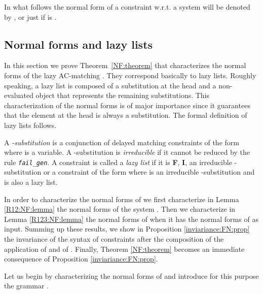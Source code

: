 \documentclass[submission,copyright,creativecommons]{eptcs}
\newcommand \lazy{}
\numberwithin{subcase}{case}
\begin{document}
In what follows the normal form of a constraint  w.r.t. 
a system   will be denoted by , or just
 if  is \lazy.

\subsection{Normal forms and lazy lists}
\label{NF:subsec}
In this section we prove Theorem~\ref{NF:theorem} that characterizes  the normal forms
of the lazy AC-matching \lazy. They correspond basically to lazy lists. 
Roughly speaking, a lazy list is composed of a  substitution at the head
 and  a non-evaluated  object that represents the remaining substitutions.  
This characterization of the normal forms is of major importance since 
it guarantees   that  the  element at the head  is always a substitution. 
The formal definition of lazy lists follows.

\begin{definition}
\label{wfll:def}
A \emph{-substitution} is a conjunction of delayed matching constraints of
the form  where  is a variable. A -substitution is
\emph{irreducible} if it cannot be reduced by the rule \texttt{\emph{fail\_gen}}. A
constraint is called a \emph{lazy list} if it is \textbf{F}, \textbf{I}, an
irreducible -substitution or a constraint of the form 
where  is an irreducible -substitution and  
 is also a lazy list.
\end{definition}

In order to characterize the normal forms of \lazy we first characterize in Lemma
\ref{R12:NF:lemma} the normal forms  of the system . Then we characterize in Lemma
 \ref{R123:NF:lemma} the normal forms of 
when it has  the normal forms of  as input. Summing up these results,
we show in
 Proposition \ref{inviariance:FN:prop}
the invariance of the syntax of constraints after the composition of the
application of  and of . Finally, Theorem \ref{NF:theorem}
becomes an immediate consequence of Proposition \ref{inviariance:FN:prop}.

Let us begin by characterizing the normal forms of  and introduce for
this purpose the grammar .
\end{document}
